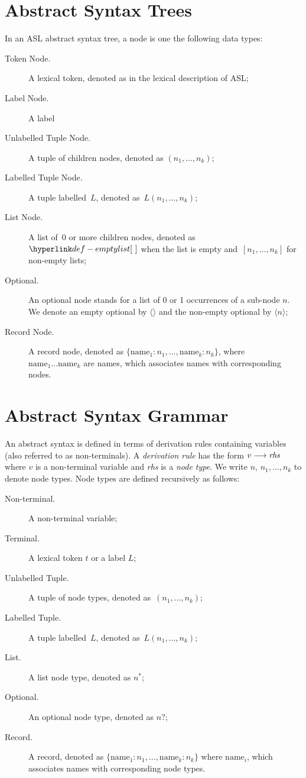 \section{Abstract Syntax Trees\label{sec:AbstractSyntaxTrees}}

In an ASL abstract syntax tree, a node is one the following data types:
\begin{description}
\item[Token Node.] A lexical token, denoted as in the lexical description of ASL;
\item[Label Node.] A label
\item[Unlabelled Tuple Node.] A tuple of children nodes, denoted as $(n_1,\ldots,n_k)$;
\item[Labelled Tuple Node.] A tuple labelled~$L$, denoted as~$L(n_1,\ldots,n_k)$;
\item[List Node.] A list of~$0$ or more children nodes, denoted as~$\emptylist$
      when the list is empty and~$[n_1,\ldots,n_k]$ for non-empty lists;
\item[Optional.] An optional node stands for a list of 0 or 1 occurrences of a sub-node $n$. We denote an empty optional by $\langle\rangle$ and the non-empty optional by $\langle n \rangle$;
\item[Record Node.] A record node, denoted as $\{\text{name}_1 : n_1,\ldots,\text{name}_k : n_k\}$, where \\
      $\text{name}_1 \ldots \text{name}_k$ are names, which associates names with corresponding nodes.
\end{description}

\section{Abstract Syntax Grammar\label{sec:AbstractSyntaxGrammar}}

An abstract syntax is defined in terms of derivation rules containing variables (also referred to as non-terminals).
%
A \emph{derivation rule} has the form $v \longrightarrow \textit{rhs}$ where $v$ is a non-terminal variable and \textit{rhs} is a \emph{node type}. We write $n$, $n_1,\ldots,n_k$ to denote node types.
%
Node types are defined recursively as follows:
\begin{description}
\item[Non-terminal.] A non-terminal variable;
\item[Terminal.] A lexical token $t$ or a label $L$;
\item[Unlabelled Tuple.] A tuple of node types, denoted as~$(n_1,\ldots,n_k)$;
\item[Labelled Tuple.] A tuple labelled~$L$, denoted as~$L(n_1,\ldots,n_k)$;
\item[List.] A list node type, denoted as $n^{*}$;
\item[Optional.] An optional node type, denoted as $n?$;
\item[Record.] A record, denoted as $\{\text{name}_1 : n_1,\ldots,\text{name}_k : n_k\}$ where $\text{name}_i$, which associates names with corresponding node types.
\end{description}

